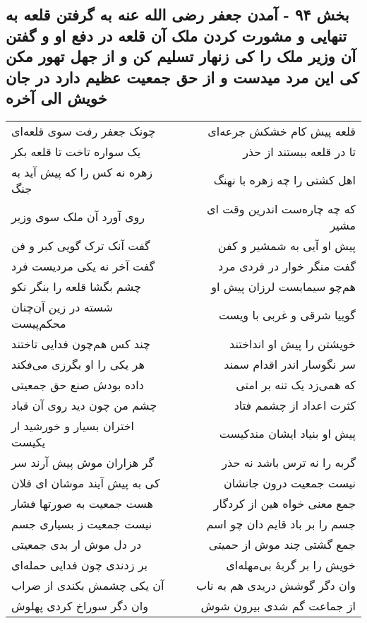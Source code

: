 \begin{center}
\section*{بخش ۹۴ - آمدن جعفر رضی الله عنه به گرفتن قلعه به تنهایی و مشورت کردن ملک آن قلعه در دفع او و گفتن آن وزیر ملک را کی زنهار تسلیم کن و از  جهل تهور مکن کی این مرد میدست و از حق جمعیت عظیم دارد در جان خویش الی آخره}
\label{sec:sh094}
\begin{longtable}{l p{0.5cm} r}
چونک جعفر رفت سوی قلعه‌ای
&&
قلعه پیش کام خشکش جرعه‌ای
\\
یک سواره تاخت تا قلعه بکر
&&
تا در قلعه ببستند از حذر
\\
زهره نه کس را که پیش آید به جنگ
&&
اهل کشتی را چه زهره با نهنگ
\\
روی آورد آن ملک سوی وزیر
&&
که چه چاره‌ست اندرین وقت ای مشیر
\\
گفت آنک ترک گویی کبر و فن
&&
پیش او آیی به شمشیر و کفن
\\
گفت آخر نه یکی مردیست فرد
&&
گفت منگر خوار در فردی مرد
\\
چشم بگشا قلعه را بنگر نکو
&&
هم‌چو سیمابست لرزان پیش او
\\
شسته در زین آن‌چنان محکم‌پیست
&&
گوییا شرقی و غربی با ویست
\\
چند کس هم‌چون فدایی تاختند
&&
خویشتن را پیش او انداختند
\\
هر یکی را او بگرزی می‌فکند
&&
سر نگوسار اندر اقدام سمند
\\
داده بودش صنع حق جمعیتی
&&
که همی‌زد یک تنه بر امتی
\\
چشم من چون دید روی آن قباد
&&
کثرت اعداد از چشمم فتاد
\\
اختران بسیار و خورشید ار یکیست
&&
پیش او بنیاد ایشان مندکیست
\\
گر هزاران موش پیش آرند سر
&&
گربه را نه ترس باشد نه حذر
\\
کی به پیش آیند موشان ای فلان
&&
نیست جمعیت درون جانشان
\\
هست جمعیت به صورتها فشار
&&
جمع معنی خواه هین از کردگار
\\
نیست جمعیت ز بسیاری جسم
&&
جسم را بر باد قایم دان چو اسم
\\
در دل موش ار بدی جمعیتی
&&
جمع گشتی چند موش از حمیتی
\\
بر زدندی چون فدایی حمله‌ای
&&
خویش را بر گربهٔ بی‌مهله‌ای
\\
آن یکی چشمش بکندی از ضراب
&&
وان دگر گوشش دریدی هم به ناب
\\
وان دگر سوراخ کردی پهلوش
&&
از جماعت گم شدی بیرون شوش

\end{longtable}
\end{center}
